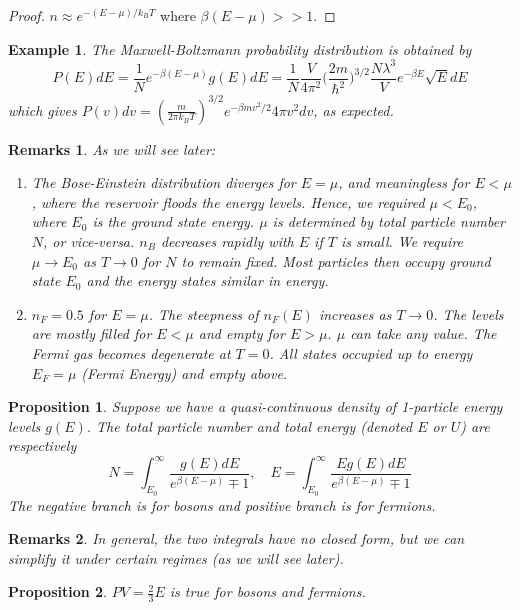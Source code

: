 \documentclass[a4paper]{article}
\newtheorem{eg}{Example}[section]
\newtheorem{remarks}{Remarks}[section]
\theoremstyle{new}
\newtheorem{prop}{Proposition}[section]
\begin{document}
\begin{proof}
$n\approx e^{-(E-\mu)/k_BT}$ where $\beta(E-\mu)>>1$.
\end{proof}
\begin{eg}
The Maxwell-Boltzmann probability distribution is obtained by
$$P(E)dE=\frac{1}{N}e^{-\beta(E-\mu)}g(E)dE=\frac{1}{N}\frac{V}{4\pi^2}\bigg(\frac{2m}{\hbar^2}\bigg)^{3/2}\frac{N\lambda^3}{V}e^{-\beta E}\sqrt{E}dE$$
which gives $P(v)dv=(\frac{m}{2\pi k_BT})^{3/2}e^{-\beta mv^2/2}4\pi v^2dv$, as expected.
\end{eg}
\begin{remarks}
As we will see later:
\begin{enumerate}
    \item The Bose-Einstein distribution diverges for $E=\mu$, and meaningless for $E<\mu$, where the reservoir floods the energy levels. Hence, we required $\mu<E_0$, where $E_0$ is the ground state energy. $\mu$ is determined by total particle number $N$, or vice-versa. $n_B$ decreases rapidly with $E$ if $T$ is small. We require $\mu\rightarrow E_0$ as $T\rightarrow 0$ for $N$ to remain fixed. Most particles then occupy ground state $E_0$ and the energy states similar in energy. 
    \item $n_F=0.5$ for $E=\mu$. The steepness of $n_F(E)$ increases as $T\rightarrow 0$. The levels are mostly filled for $E<\mu$ and empty for $E>\mu$. $\mu$ can take any value. The Fermi gas becomes degenerate at $T=0$. All states occupied up to energy $E_F=\mu$ (Fermi Energy) and empty above.
\end{enumerate}
\end{remarks}
\begin{prop}
Suppose we have a quasi-continuous density of 1-particle energy levels $g(E)$. The total particle number and total energy (denoted $E$ or $U$) are respectively
\begin{equation}
N=\int_{E_{0}}^\infty\frac{g(E)dE}{e^{\beta(E-\mu)}\mp 1},\quad E=\int_{E_{0}}^\infty\frac{E g(E)dE}{e^{\beta(E-\mu)}\mp 1}\label{bosonsfermions3}
\end{equation}
The negative branch is for bosons and positive branch is for fermions. 
\end{prop}
\begin{remarks}
In general, the two integrals have no closed form, but we can simplify it under certain regimes (as we will see later). 
\end{remarks} 
\begin{prop}
$PV=\frac{2}{3}E$ is true for bosons and fermions.
\end{prop}
\end{document}
